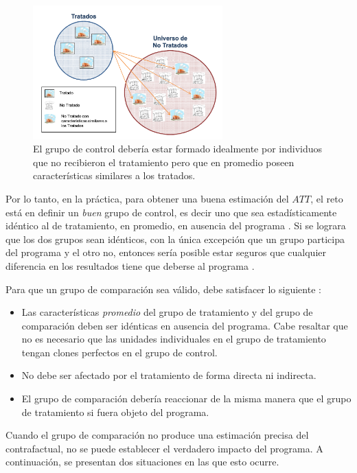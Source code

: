\documentclass[../../main.tex]{subfiles}
\begin{document}
\begin{figure}[h!]
    \centering
    \includegraphics[width=0.65\textwidth]{figs/grupo-de-control.png}
    \caption{El grupo de control debería estar formado idealmente por individuos que no
    recibieron el tratamiento pero que en promedio poseen características similares a
    los tratados.}
    \label{fig:control-group}
\end{figure}

Por lo tanto, en la práctica, para obtener una buena estimación del \(ATT\), el reto está
en definir un \textit{buen} grupo de control, es decir uno que sea estadísticamente
idéntico al de tratamiento, en promedio, en ausencia del programa \cite{gertler-2016}. Si
se lograra que los dos grupos sean idénticos, con la única excepción que un grupo
participa del programa y el otro no, entonces sería posible estar seguros que cualquier
diferencia en los resultados tiene que deberse al programa \cite{gertler-2016}.

Para que un grupo de comparación sea válido, debe satisfacer lo siguiente \cite{gertler-2016}:
\begin{itemize}
    \item Las características \textit{promedio} del grupo de tratamiento y del grupo de
    comparación deben ser idénticas en ausencia del programa. Cabe resaltar que no es
    necesario que las unidades individuales en el grupo de tratamiento tengan clones
    perfectos en el grupo de control.
    \item No debe ser afectado por el tratamiento de forma directa ni indirecta.
    \item El grupo de comparación debería reaccionar de la misma manera que el grupo de
    tratamiento si fuera objeto del programa.
\end{itemize}

Cuando el grupo de comparación no produce una estimación precisa del contrafactual, no se
puede establecer el verdadero impacto del programa. A continuación, se presentan dos
situaciones en las que esto ocurre.
\end{document}
